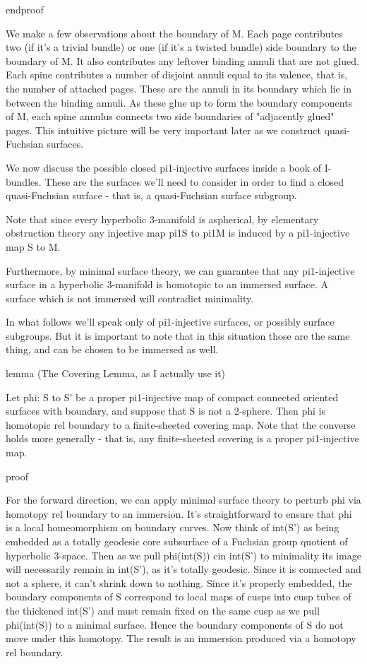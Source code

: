 endproof

We make a few observations about the boundary of M. Each page contributes two
(if it's a trivial bundle) or one (if it's a twisted bundle) side boundary to
the boundary of M. It also contributes any leftover binding annuli that are not
glued. Each spine contributes a number of disjoint annuli equal to its valence,
that is, the number of attached pages. These are the annuli in its boundary
which lie in between the binding annuli. As these glue up to form the boundary
components of M, each spine annulus connects two side boundaries of "adjacently
glued" pages. This intuitive picture will be very important later as we
construct quasi-Fuchsian surfaces.


We now discuss the possible closed pi1-injective surfaces inside a book of
I-bundles. These are the surfaces we'll need to consider in order to find
a closed quasi-Fuchsian surface - that is, a quasi-Fuchsian surface subgroup.

Note that since every hyperbolic 3-manifold is aspherical, by elementary
obstruction theory any injective map pi1S to pi1M is induced by a pi1-injective
map S to M.

Furthermore, by minimal surface theory, we can guarantee that any pi1-injective
surface in a hyperbolic 3-manifold is homotopic to an immersed surface.
A surface which is not immersed will contradict minimality.

In what follows we'll speak only of pi1-injective surfaces, or possibly surface
subgroups. But it is important to note that in this situation those are the
same thing, and can be chosen to be immersed as well.

lemma (The Covering Lemma, as I actually use it)

Let phi: S to S' be a proper pi1-injective map of compact connected oriented
surfaces with boundary, and suppose that S is not a 2-sphere.  Then phi is
homotopic rel boundary to a finite-sheeted covering map.  Note that the
converse holds more generally - that is, any finite-sheeted covering is
a proper pi1-injective map.

proof

For the forward direction, we can apply minimal surface theory to perturb phi
via homotopy rel boundary to an immersion. It's straightforward to ensure that
phi is a local homeomorphism on boundary curves. Now think of int(S') as being
embedded as a totally geodesic core subsurface of a Fuchsian group quotient of
hyperbolic 3-space.  Then as we pull phi(int(S)) cin int(S')  to minimality its
image will necessarily remain in int(S'), as it's totally geodesic.  Since it
is connected and not a sphere, it can't shrink down to nothing. Since it's
properly embedded, the boundary components of S correspond to local maps of
cusps into cusp tubes of the thickened int(S') and must remain fixed on the
same cusp as we pull phi(int(S)) to a minimal surface. Hence the boundary
components of S do not move under this homotopy. The result is an immersion
produced via a homotopy rel boundary.

